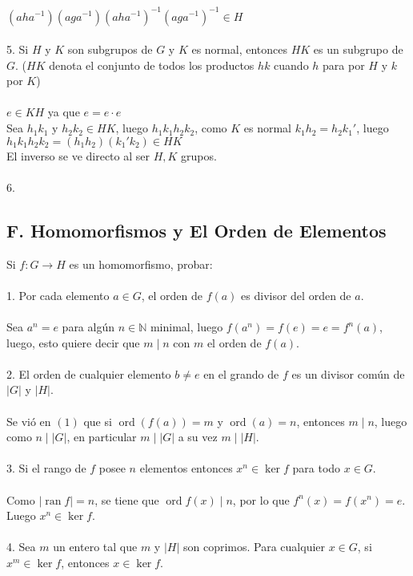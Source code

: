 \documentclass{article}
\begin{document}
$(aha^{-1})(aga^{-1})(aha^{-1})^{-1}(aga^{-1})^{-1} \in H$
\\
\\
5. Si $H$ y $K$ son subgrupos de $G$ y $K$ es normal, entonces $HK$ es un subgrupo de $G$. ($HK$ denota el conjunto de todos los productos $hk$ cuando $h$ para por $H$ y $k$ por $K$)
\\
\\
$e \in KH$ ya que $e=e\cdot e$
\\
Sea $h_1k_1$ y $h_2k_2 \in HK$, luego $h_1k_1h_2k_2$, como $K$ es normal $k_1h_2=h_2k_1'$, luego $h_1k_1h_2k_2=(h_1h_2)(k_1'k_2) \in HK$
\\
El inverso se ve directo al ser $H,K$ grupos.
\\
\\
6.
\subsection*{F. Homomorfismos y El Orden de Elementos}
Si $f: G \to H$ es un homomorfismo, probar:
\\
\\
1. Por cada elemento $a \in G$, el orden de $f(a)$ es divisor del orden de $a$.
\\
\\
Sea $a^{n}=e$ para algún $n \in \mathbb{N}$ minimal, luego $f(a^{n})=f(e)=e=f^{n}(a)$, luego, esto quiere decir que $m \mid n$ con $m$ el orden de $f(a)$.
\\
\\
2. El orden de cualquier elemento $b \neq e$ en el grando de $f$ es un divisor común de $|G|$ y $|H|$.
\\
\\
Se vió en $(1)$ que si $\operatorname{ord}{(f(a))}=m$ y $\operatorname{ord}{(a)}=n$, entonces $m \mid n$, luego como $n \mid |G|$, en particular $m \mid |G|$ a su vez $m \mid |H|$.
\\
\\
3. Si el rango de $f$ posee $n$ elementos entonces $x^{n} \in \ker{f}$ para todo $x \in G$.
\\
\\
Como $|\operatorname{ran}{f}|=n$, se tiene que $\operatorname{ord}{f(x)}\mid n$, por lo que $f^{n}(x)=f(x^{n})=e$. Luego $x^{n} \in \ker{f}$.
\\
\\
4. Sea $m$ un entero tal que $m$ y $|H|$ son coprimos. Para cualquier $x \in G$, si $x^{m} \in \ker{f}$, entonces $x \in \ker{f}$.
\\
\\
\end{document}

